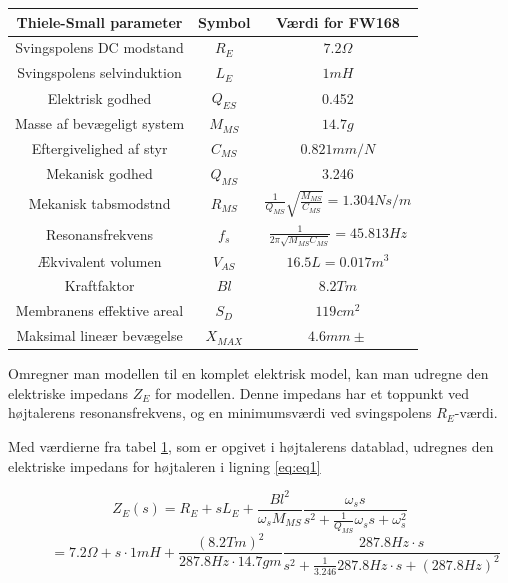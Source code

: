 \begin{table}
	\centering
	\begin{tabular}[C]{|c|c|c|}
		
		
		\hline	
		\textbf{Thiele-Small parameter} & \textbf{Symbol} & \textbf{Værdi for FW168} \\\hline
		Svingspolens DC modstand & $R_E$ & $7.2\Omega$ \\\hline
		Svingspolens selvinduktion & $L_E$ & $1mH$  \\\hline
		Elektrisk godhed & $Q_{ES}$ & 0.452 \\\hline
		Masse af bevægeligt system & $M_{MS}$ & $14.7g$  \\\hline
		Eftergivelighed af styr & $C_{MS}$ & $0.821mm/N$  \\\hline
		Mekanisk godhed & $Q_{MS}$ & 3.246  \\\hline
		Mekanisk tabsmodstnd & $R_{MS}$ & \( \frac{1}{Q_{MS}}\sqrt{\frac{M_{MS}}{C_{MS}}}=1.304Ns/m \)  \\\hline
		Resonansfrekvens & $f_s$ & \( \frac{1}{2\pi\sqrt{M_{MS} C_{MS}}}=45.813Hz \) \\\hline
		
		
		Ækvivalent volumen & $ V_{AS} $ & $16.5L=0.017m^3$ \\\hline
		Kraftfaktor & $Bl$ & $8.2Tm$ \\\hline
		Membranens effektive areal & $S_D$ & $119cm^2$ \\\hline
		Maksimal lineær bevægelse & $X_{MAX}$ & $4.6mm\pm$ \\\hline
		
	\end{tabular}
	\label{tab:TS}
\end{table}

Omregner man modellen til en komplet elektrisk model, kan man udregne den elektriske impedans $Z_E$ for modellen. Denne impedans har et toppunkt ved højtalerens resonansfrekvens, og en minimumsværdi ved svingspolens $R_E$-værdi. 

Med værdierne fra tabel \ref{tab:TS}, som er opgivet i højtalerens datablad\cite{FW168}, udregnes den elektriske impedans for højtaleren i ligning \ref{eq:eq1}

\begin{equation}\label{eq:eq1}
	Z_E(s)=R_E+sL_E+\frac{Bl^2}{\omega_s M_{MS}} \frac{ \omega_s s}{ s^2 + \frac{1}{Q_{MS}} \omega_s s + \omega_s^2} \end{equation} \begin{equation} \ \qquad  = 
	7.2\Omega + s \cdot 1mH + \frac{(8.2 Tm)^2}{287.8Hz \cdot 14.7gm} \frac{ 287.8Hz \cdot s}{ s^2 + \frac{1}{3.246} 287.8Hz \cdot s + (287.8Hz)^2}  \end{equation}

